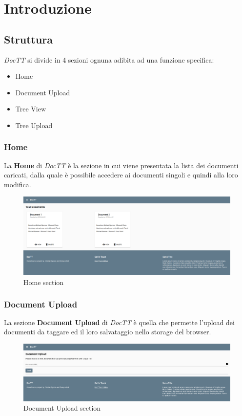 \documentclass[twoside]{supsistudent}
\begin{document}
\chapter{Introduzione}

\section{Struttura}

\textit{DocTT} si divide in 4 sezioni ognuna adibita ad una funzione specifica:
\begin{itemize}
  \item Home
  \item Document Upload
  \item Tree View
  \item Tree Upload
\end{itemize}

\subsection{Home}
La \textbf{Home} di \textit{DocTT} è la sezione in cui viene presentata la 
lista dei documenti caricati, dalla quale è possibile accedere ai documenti 
singoli e quindi alla loro modifica.

\begin{figure}[h!]
  \includegraphics[width=\linewidth]{figures/home.png}
  \caption{Home section}
  \label{fig:home}
\end{figure}

\pagebreak

\subsection{Document Upload}
La sezione \textbf{Document Upload} di \textit{DocTT} è quella che permette
l'upload dei documenti da taggare ed il loro salvataggio nello storage del 
browser.

\begin{figure}[h!]
  \includegraphics[width=\linewidth]{figures/docUpload.png}
  \caption{Document Upload section}
  \label{fig:docUpload}
\end{figure}
\end{document}
